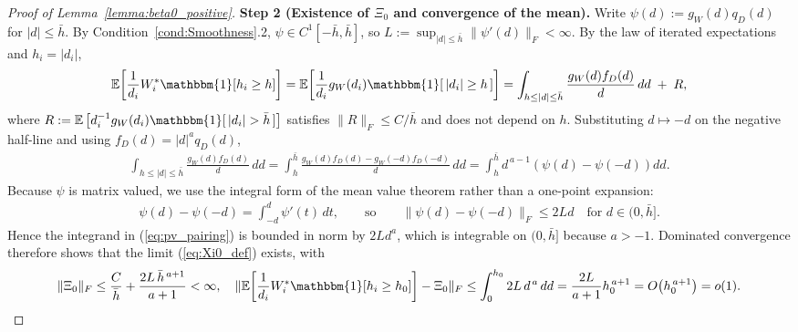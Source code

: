 \documentclass{article}
\newcommand{\normm}[1]{\lVert#1\rVert}
\newcommand{\E}{\mathbb{E}}
\newcommand{\I}{\mathbbm{1}}
\begin{document}
\begin{appendices}
\begin{proof}[Proof of Lemma~\ref{lemma:beta0_positive}]
\textbf{Step 2 (Existence of $\Xi_0$ and convergence of the mean).}
Write $\psi(d):=g_W(d)q_D(d)$ for $|d|\le\bar h$. By
Condition~\ref{cond:Smoothness}.2, $\psi\in C^{1}[-\bar h,\bar h]$, so
$L:=\sup_{|d|\le\bar h}\normm{\psi'(d)}_F<\infty$. By the law of iterated
expectations and $h_i=|d_i|$,
\begin{align*}
    \E\!\left[\frac{1}{d_i}W_i^{*}\I[h_i\ge h]\right]
    = \E\!\left[\frac{1}{d_i}g_W(d_i)\I[\,|d_i|\ge h\,]\right]
    = \int_{h\le|d|\le\bar h}\frac{g_W(d)f_D(d)}{d}\,dd \;+\; R,
\end{align*}
where $R:=\E\left[d_i^{-1}g_W(d_i)\I[\,|d_i|>\bar h\,]\right]$ satisfies
$\normm{R}_F\le C/\bar h$ and does not depend on $h$. Substituting $d\mapsto-d$
on the negative half-line and using $f_D(d)=|d|^{a}q_D(d)$,
\begin{align}\label{eq:pv_pairing}
    \int_{h\le|d|\le\bar h}\frac{g_W(d)f_D(d)}{d}\,dd
    = \int_{h}^{\bar h}\frac{g_W(d)f_D(d)-g_W(-d)f_D(-d)}{d}\,dd
    = \int_{h}^{\bar h} d^{\,a-1}\left(\psi(d)-\psi(-d)\right)dd .
\end{align}
Because $\psi$ is matrix valued, we use the integral form of the mean value
theorem rather than a one-point expansion:
\begin{align}\label{eq:mvt}
    \psi(d)-\psi(-d)=\int_{-d}^{d}\psi'(t)\,dt,
    \qquad\text{so}\qquad
    \normm{\psi(d)-\psi(-d)}_F\le 2Ld \quad\text{for } d\in(0,\bar h].
\end{align}
Hence the integrand in (\ref{eq:pv_pairing}) is bounded in norm by $2Ld^{a}$,
which is integrable on $(0,\bar h]$ because $a>-1$. Dominated convergence
therefore shows that the limit (\ref{eq:Xi0_def}) exists, with
\begin{align}\label{eq:mean_rate}
    \normm{\Xi_0}_F \le \frac{C}{\bar h} + \frac{2L\,\bar h^{\,a+1}}{a+1}<\infty ,\quad     \normm{\E\!\left[\frac{1}{d_i}W_i^{*}\I[h_i\ge h_0]\right]-\Xi_0}_F
    \le \int_{0}^{h_0} 2L\,d^{\,a}\,dd = \frac{2L}{a+1}h_0^{\,a+1}= O\!\left(h_0^{\,a+1}\right)=o(1).
\end{align}


\end{proof}
\end{appendices}
\end{document}
